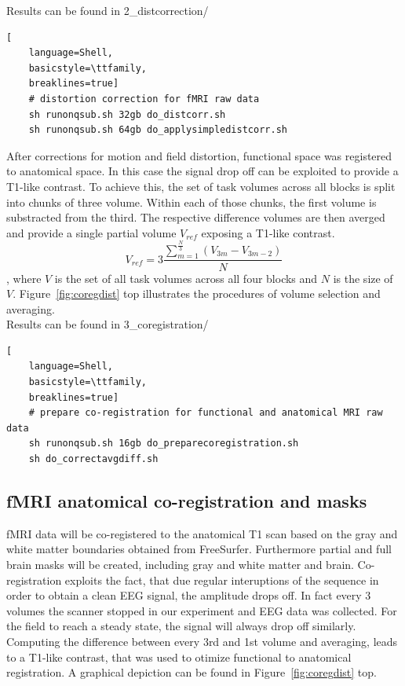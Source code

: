 \documentclass[12pt,a4paper]{scrartcl}
\begin{document}
\noindent Results can be found in 2\_distcorrection/\\
\begin{lstlisting}[
    language=Shell,
    basicstyle=\ttfamily,
    breaklines=true]
    # distortion correction for fMRI raw data
    sh runonqsub.sh 32gb do_distcorr.sh
    sh runonqsub.sh 64gb do_applysimpledistcorr.sh
\end{lstlisting}
After corrections for motion and field distortion, functional space was registered to anatomical space. In this case the signal drop off can be exploited to provide a T1-like contrast. To achieve this, the set of task volumes across all blocks is split into chunks of three volume. Within each of those chunks, the first volume is substracted from the third. The respective difference volumes are then averged and provide a single partial volume $V_{ref}$ exposing a T1-like contrast.
\begin{equation}
  V_{ref}=3\frac{\sum_{m=1}^{\frac{N}{3}}(V_{3m}-V_{3m-2})}{N}
\end{equation}
\noindent, where $V$ is the set of all task volumes across all four blocks and $N$ is the size of $V$. Figure~\ref{fig:coregdist} top illustrates the procedures of volume selection and averaging.\\

\noindent Results can be found in 3\_coregistration/\\
\begin{lstlisting}[
    language=Shell,
    basicstyle=\ttfamily,
    breaklines=true]
    # prepare co-registration for functional and anatomical MRI raw data
    sh runonqsub.sh 16gb do_preparecoregistration.sh
    sh do_correctavgdiff.sh
\end{lstlisting}

\subsection{fMRI anatomical co-registration and masks}
fMRI data will be co-registered to the anatomical T1 scan based on the gray and white matter boundaries obtained from FreeSurfer. Furthermore partial and full brain masks will be created, including gray and white matter and brain. Co-registration exploits the fact, that due regular interuptions of the sequence in order to obtain a clean EEG signal, the amplitude drops off. In fact every 3 volumes the scanner stopped in our experiment and EEG data was collected. For the field to reach a steady state, the signal will always drop off similarly.\\
\noindent Computing the difference between every 3rd and 1st volume and averaging, leads to a T1-like contrast, that was used to otimize functional to anatomical registration. A graphical depiction can be found in Figure~\ref{fig:coregdist} top.\\
\end{document}
